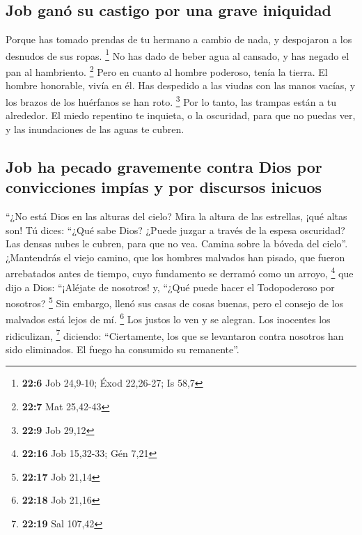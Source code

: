 \hypertarget{job-ganuxf3-su-castigo-por-una-grave-iniquidad}{%
\subsection{Job ganó su castigo por una grave
iniquidad}\label{job-ganuxf3-su-castigo-por-una-grave-iniquidad}}

 Porque has tomado prendas de tu hermano a cambio de nada,
y despojaron a los desnudos de sus ropas. \footnote{\textbf{22:6} Job
  24,9-10; Éxod 22,26-27; Is 58,7}  No has dado de beber
agua al cansado, y has negado el pan al hambriento. \footnote{\textbf{22:7}
  Mat 25,42-43}  Pero en cuanto al hombre poderoso, tenía
la tierra. El hombre honorable, vivía en él.  Has
despedido a las viudas con las manos vacías, y los brazos de los
huérfanos se han roto. \footnote{\textbf{22:9} Job 29,12}
 Por lo tanto, las trampas están a tu alrededor. El miedo
repentino te inquieta,  o la oscuridad, para que no
puedas ver, y las inundaciones de las aguas te cubren.

\hypertarget{job-ha-pecado-gravemente-contra-dios-por-convicciones-impuxedas-y-por-discursos-inicuos}{%
\subsection{Job ha pecado gravemente contra Dios por convicciones impías
y por discursos
inicuos}\label{job-ha-pecado-gravemente-contra-dios-por-convicciones-impuxedas-y-por-discursos-inicuos}}

 ``¿No está Dios en las alturas del cielo? Mira la altura
de las estrellas, ¡qué altas son!  Tú dices: ``¿Qué sabe
Dios? ¿Puede juzgar a través de la espesa oscuridad?  Las
densas nubes le cubren, para que no vea. Camina sobre la bóveda del
cielo''.  ¿Mantendrás el viejo camino, que los hombres
malvados han pisado,  que fueron arrebatados antes de
tiempo, cuyo fundamento se derramó como un arroyo, \footnote{\textbf{22:16}
  Job 15,32-33; Gén 7,21}  que dijo a Dios: ``¡Aléjate de
nosotros! y, ``¿Qué puede hacer el Todopoderoso por nosotros?
\footnote{\textbf{22:17} Job 21,14}  Sin embargo, llenó
sus casas de cosas buenas, pero el consejo de los malvados está lejos de
mí. \footnote{\textbf{22:18} Job 21,16}  Los justos lo
ven y se alegran. Los inocentes los ridiculizan, \footnote{\textbf{22:19}
  Sal 107,42}  diciendo: ``Ciertamente, los que se
levantaron contra nosotros han sido eliminados. El fuego ha consumido su
remanente''.

